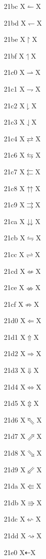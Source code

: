 \documentclass[11pt]{article}
\begin{document}
21bc X{\ensuremath{\leftharpoonup}}X

21bd X{\ensuremath{\leftharpoondown}}X

21be X{\ensuremath{\upharpoonright}}X

21bf X{\ensuremath{\upharpoonleft}}X

21c0 X{\ensuremath{\rightharpoonup}}X

21c1 X{\ensuremath{\rightharpoondown}}X

21c2 X{\ensuremath{\downharpoonright}}X

21c3 X{\ensuremath{\downharpoonleft}}X

21c4 X{\ensuremath{\rightleftarrows}}X

21c6 X{\ensuremath{\leftrightarrows}}X

21c7 X{\ensuremath{\leftleftarrows}}X

21c8 X{\ensuremath{\upuparrows}}X

21c9 X{\ensuremath{\rightrightarrows}}X

21ca X{\ensuremath{\downdownarrows}}X

21cb X{\ensuremath{\leftrightharpoons}}X

21cc X{\ensuremath{\rightleftharpoons}}X

21cd X{\ensuremath{\nLeftarrow}}X

21ce X{\ensuremath{\nLeftrightarrow}}X

21cf X{\ensuremath{\nRightarrow}}X

21d0 X{\ensuremath{\Leftarrow}}X

21d1 X{\ensuremath{\Uparrow}}X

21d2 X{\ensuremath{\Rightarrow}}X

21d3 X{\ensuremath{\Downarrow}}X

21d4 X{\ensuremath{\Leftrightarrow}}X

21d5 X{\ensuremath{\Updownarrow}}X

21d6 X{\ensuremath{\Nwarrow}}X

21d7 X{\ensuremath{\Nearrow}}X

21d8 X{\ensuremath{\Searrow}}X

21d9 X{\ensuremath{\Swarrow}}X

21da X{\ensuremath{\Lleftarrow}}X

21db X{\ensuremath{\Rrightarrow}}X

21dc X{\ensuremath{\leftsquigarrow}}X

21dd X{\ensuremath{\rightsquigarrow}}X

21e0 X{\ensuremath{\dashleftarrow}}X
\end{document}
